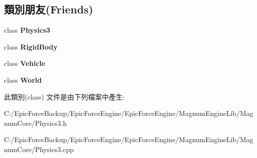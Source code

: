 \subsection*{類別朋友(Friends)}
\begin{DoxyCompactItemize}
\item 
class {\bfseries Physics3}\hypertarget{class_magnum_1_1_physics3_1_1_manager_a61d0ff9334956c92044d28d3755e8c83}{}\label{class_magnum_1_1_physics3_1_1_manager_a61d0ff9334956c92044d28d3755e8c83}

\item 
class {\bfseries Rigid\+Body}\hypertarget{class_magnum_1_1_physics3_1_1_manager_abb8b03bec6b0a8e0834c8358c93039d2}{}\label{class_magnum_1_1_physics3_1_1_manager_abb8b03bec6b0a8e0834c8358c93039d2}

\item 
class {\bfseries Vehicle}\hypertarget{class_magnum_1_1_physics3_1_1_manager_a74c93d9d035fcad5381bfb57de0426a1}{}\label{class_magnum_1_1_physics3_1_1_manager_a74c93d9d035fcad5381bfb57de0426a1}

\item 
class {\bfseries World}\hypertarget{class_magnum_1_1_physics3_1_1_manager_a7b4bcdf992c21ae83363f25df05b1d25}{}\label{class_magnum_1_1_physics3_1_1_manager_a7b4bcdf992c21ae83363f25df05b1d25}

\end{DoxyCompactItemize}


此類別(class) 文件是由下列檔案中產生\+:\begin{DoxyCompactItemize}
\item 
C\+:/\+Epic\+Force\+Backup/\+Epic\+Force\+Engine/\+Epic\+Force\+Engine/\+Magnum\+Engine\+Lib/\+Magnum\+Core/Physics3.\+h\item 
C\+:/\+Epic\+Force\+Backup/\+Epic\+Force\+Engine/\+Epic\+Force\+Engine/\+Magnum\+Engine\+Lib/\+Magnum\+Core/Physics3.\+cpp\end{DoxyCompactItemize}
